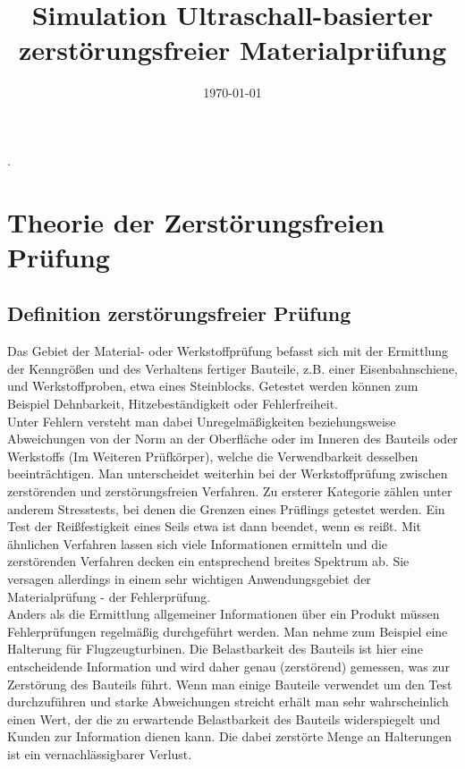 \documentclass[reducespace,stylepage,semiarbeit]{spezidoc}
\title{Simulation Ultraschall-basierter zerstörungsfreier Materialprüfung}
\date{\today}
\begin{document}
\maketitlepage
\newpage


\tableofcontents
\thispagestyle{empty}
\newpage

. 


\setcounter{page}{1}

\section{Theorie der Zerstörungsfreien Prüfung}
\subsection{Definition zerstörungsfreier Prüfung}
Das Gebiet der Material- oder Werkstoffprüfung befasst sich mit der Ermittlung der Kenngrößen und des Verhaltens fertiger Bauteile, z.B. 
einer Eisenbahnschiene, und Werkstoffproben, etwa eines Steinblocks. 
Getestet werden können zum Beispiel Dehnbarkeit, Hitzebeständigkeit oder Fehlerfreiheit.\\ 
Unter Fehlern versteht man dabei Unregelmäßigkeiten beziehungsweise Abweichungen von der Norm an der Oberfläche oder im Inneren des Bauteils oder Werkstoffs (Im Weiteren Prüfkörper), welche die Verwendbarkeit desselben beeinträchtigen. 
Man unterscheidet weiterhin bei der Werkstoffprüfung zwischen zerstörenden und zerstörungsfreien Verfahren. 
Zu ersterer Kategorie zählen unter anderem Stresstests, bei denen die Grenzen eines Prüflings getestet werden. 
Ein Test der Reißfestigkeit eines Seils etwa ist dann beendet, wenn es reißt. 
Mit ähnlichen Verfahren lassen sich viele Informationen ermitteln und die zerstörenden Verfahren decken ein entsprechend breites Spektrum ab. 
Sie versagen allerdings in einem sehr wichtigen Anwendungsgebiet der Materialprüfung - der Fehlerprüfung.\\
Anders als die Ermittlung allgemeiner Informationen über ein Produkt müssen Fehlerprüfungen regelmäßig durchgeführt werden. 
Man nehme zum Beispiel eine Halterung für Flugzeugturbinen. 
Die Belastbarkeit des Bauteils ist hier eine entscheidende Information und wird daher genau (zerstörend) gemessen, was zur Zerstörung des Bauteils führt. 
Wenn man einige Bauteile verwendet um den Test durchzuführen und starke Abweichungen streicht erhält man sehr wahrscheinlich einen Wert, der die zu erwartende Belastbarkeit des Bauteils widerspiegelt und Kunden zur Information dienen kann. 
Die dabei zerstörte Menge an Halterungen ist ein vernachlässigbarer Verlust.\\
\end{document}
